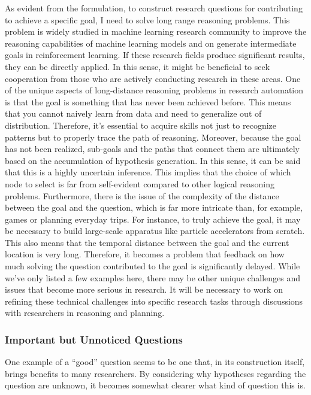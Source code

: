 As evident from the formulation, to construct research questions for contributing to achieve a specific goal, I need to solve long range reasoning problems. This problem is widely studied in machine learning research community to improve the reasoning capabilities of machine learning models and on generate intermediate goals in reinforcement learning. If these research fields produce significant results, they can be directly applied. In this sense, it might be beneficial to seek cooperation from those who are actively conducting research in these areas. One of the unique aspects of long-distance reasoning problems in research automation is that the goal is something that has never been achieved before. This means that you cannot naively learn from data and need to generalize out of distribution. Therefore, it's essential to acquire skills not just to recognize patterns but to properly trace the path of reasoning. Moreover, because the goal has not been realized, sub-goals and the paths that connect them are ultimately based on the accumulation of hypothesis generation. In this sense, it can be said that this is a highly uncertain inference. This implies that the choice of which node to select is far from self-evident compared to other logical reasoning problems. Furthermore, there is the issue of the complexity of the distance between the goal and the question, which is far more intricate than, for example, games or planning everyday trips. For instance, to truly achieve the goal, it may be necessary to build large-scale apparatus like particle accelerators from scratch. This also means that the temporal distance between the goal and the current location is very long. Therefore, it becomes a problem that feedback on how much solving the question contributed to the goal is significantly delayed. While we've only listed a few examples here, there may be other unique challenges and issues that become more serious in research. It will be necessary to work on refining these technical challenges into specific research tasks through discussions with researchers in reasoning and planning.

\subsubsection{Important but Unnoticed Questions}

One example of a ``good'' question seems to be one that, in its construction itself, brings benefits to many researchers. By considering why hypotheses regarding the question are unknown, it becomes somewhat clearer what kind of question this is.

